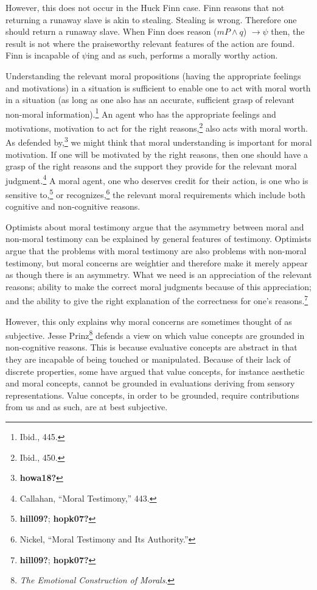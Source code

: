 \documentclass[phdthesis,12pt,final]{wuthesis}
\theoremstyle{definition}
\theoremstyle{definition}
\theoremstyle{definition}
\theoremstyle{definition}
\theoremstyle{remark}
\begin{document}
However, this does not occur in the Huck Finn case. Finn reasons that not returning a runaway slave is akin to stealing. Stealing is wrong. Therefore one should return a runaway slave. When Finn does reason (\(mP \land q\)) \(\rightarrow \psi\) then, the result is not where the praiseworthy relevant features of the action are found. Finn is incapable of \(\psi\)ing and as such, performs a morally worthy action.

Understanding the relevant moral propositions (having the appropriate feelings and motivations) in a situation is sufficient to enable one to act with moral worth in a situation (as long as one also has an accurate, sufficient grasp of relevant non-moral information).\footnote{Ibid., 445.} An agent who has the appropriate feelings and motivations, motivation to act for the right reasons,\footnote{Ibid., 450.} also acts with moral worth. As defended by,\footnote{\textbf{howa18?}} we might think that moral understanding is important for moral motivation. If one will be motivated by the right reasons, then one should have a grasp of the right reasons and the support they provide for the relevant moral judgment.\footnote{Callahan, {``Moral {Testimony},''} 443.} A moral agent, one who deserves credit for their action, is one who is sensitive to,\footnote{\textbf{hill09?}; \textbf{hopk07?}} or recognizes,\footnote{Nickel, {``Moral {Testimony} and Its {Authority}.''}} the relevant moral requirements which include both cognitive and non-cognitive reasons.

Optimists about moral testimony argue that the asymmetry between moral and non-moral testimony can be explained by general features of testimony. Optimists argue that the problems with moral testimony are also problems with non-moral testimony, but moral concerns are weightier and therefore make it merely appear as though there is an asymmetry. What we need is an appreciation of the relevant reasons; ability to make the correct moral judgments because of this appreciation; and the ability to give the right explanation of the correctness for one's reasons.\footnote{\textbf{hill09?}; \textbf{hopk07?}}

However, this only explains why moral concerns are sometimes thought of as subjective. Jesse Prinz\footnote{\emph{The {Emotional Construction} of {Morals}}.} defends a view on which value concepts are grounded in non-cognitive reasons. This is because evaluative concepts are abstract in that they are incapable of being touched or manipulated. Because of their lack of discrete properties, some have argued that value concepts, for instance aesthetic and moral concepts, cannot be grounded in evaluations deriving from sensory representations. Value concepts, in order to be grounded, require contributions from us and as such, are at best subjective.
\end{document}
